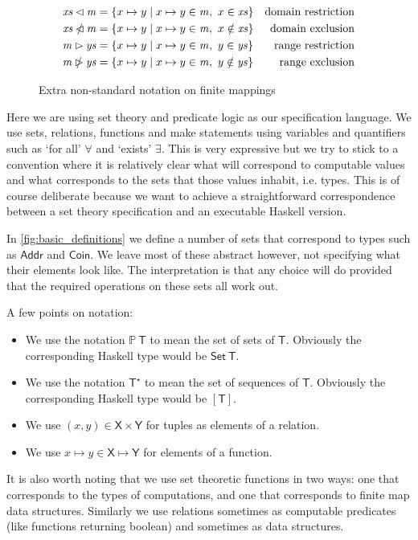 \documentclass[11pt,a4paper]{article}
\newcommand{\powerset}[1]{\mathbb{P}~#1}
\newcommand{\sequencetype}[1]{#1^\star}
\newcommand{\restrictdom}{\lhd}
\newcommand{\subtractdom}{\mathbin{\slashed{\restrictdom}}}
\newcommand{\restrictrange}{\rhd}
\newcommand{\subtractrange}{\mathbin{\slashed{\restrictrange}}}
\newcommand{\var}[1]{\mathit{#1}}
\newcommand{\type}[1]{\mathsf{#1}}
\begin{document}
\begin{figure}
\begin{align*}
  \var{xs} \restrictdom \var{m}
& = \{ x \mapsto y \mid x \mapsto y \in \var{m}, ~ x \in \var{xs} \}
& \text{domain restriction}
\\
  \var{xs} \subtractdom \var{m}
& = \{ x \mapsto y \mid x \mapsto y \in \var{m}, ~ x \notin \var{xs} \}
& \text{domain exclusion}
\\
  \var{m} \restrictrange \var{ys}
& = \{ x \mapsto y \mid x \mapsto y \in \var{m}, ~ y \in \var{ys} \}
& \text{range restriction}
\\
  \var{m} \subtractrange \var{ys}
& = \{ x \mapsto y \mid x \mapsto y \in \var{m}, ~ y \notin \var{ys} \}
& \text{range exclusion}
\end{align*}
\caption{Extra non-standard notation on finite mappings}
\label{fig:notation}
\end{figure}

Here we are using set theory and predicate logic as our specification language.
We use sets, relations, functions and make statements using variables and
quantifiers such as `for all' $\forall$ and `exists' $\exists$. This is very
expressive but we try to stick to a convention where it is relatively clear
what will correspond to computable values and what corresponds to the sets that
those values inhabit, i.e. types. This is of course deliberate because we want
to achieve a straightforward correspondence between a set theory specification
and an executable Haskell version.

In \cref{fig:basic_definitions} we define a number of sets that correspond to
types such as $\type{Addr}$ and $\type{Coin}$. We leave most of these abstract
however, not specifying what their elements look like. The interpretation is
that any choice will do provided that the required operations on these sets all
work out.

A few points on notation:
\begin{itemize}
\item We use the notation $\powerset{\type{T}}$ to mean the set of sets of
      $\type{T}$. Obviously the corresponding Haskell type would be
      $\type{Set} ~ \type{T}$.
\item We use the notation $\sequencetype{\type{T}}$ to mean the set of
      sequences of $\type{T}$. Obviously the corresponding Haskell type would
      be $[\type{T}]$.
\item We use $(x,y) \in \type{X} \times \type{Y}$ for tuples as elements of a
      relation.
\item We use $x \mapsto y \in \type{X} \mapsto \type{Y}$ for elements of a
      function.
\end{itemize}
%
It is also worth noting that we use set theoretic functions in two ways: one
that corresponds to the types of computations, and one that corresponds to
finite map data structures. Similarly we use relations sometimes as computable
predicates (like functions returning boolean) and sometimes as data structures.
\end{document}

